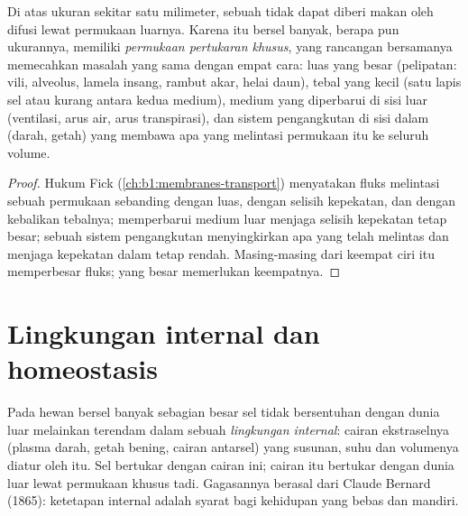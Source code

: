 \begin{proposition}\label{prop:b1:organism-environment:surfaces}
Di atas ukuran sekitar satu milimeter, sebuah  tidak dapat
diberi makan oleh difusi lewat permukaan luarnya. Karena itu 
bersel banyak, berapa pun ukurannya, memiliki \emph{permukaan pertukaran
khusus}, yang rancangan bersamanya
memecahkan masalah yang sama dengan empat cara: luas yang besar
(pelipatan: vili, alveolus, lamela insang, rambut akar, helai daun),
tebal yang kecil (satu lapis sel atau kurang antara kedua medium),
medium yang diperbarui di sisi luar (ventilasi, arus air, arus
transpirasi), dan sistem pengangkutan di sisi dalam (darah, getah) yang
membawa apa yang melintasi permukaan itu ke seluruh volume.
\end{proposition}
\begin{proof}
Hukum Fick (\cref{ch:b1:membranes-transport}) menyatakan fluks
melintasi sebuah permukaan sebanding dengan luas, dengan selisih
kepekatan, dan dengan kebalikan tebalnya; memperbarui medium luar
menjaga selisih kepekatan tetap besar; sebuah sistem pengangkutan
menyingkirkan apa yang telah melintas dan menjaga kepekatan dalam tetap
rendah. Masing-masing dari keempat ciri itu memperbesar fluks; 
yang besar memerlukan keempatnya.
\end{proof}

\section{Lingkungan internal dan homeostasis}

\begin{definition}\label{def:b1:organism-environment:milieu}
Pada hewan bersel banyak sebagian besar sel tidak bersentuhan dengan
dunia luar melainkan terendam dalam sebuah \emph{lingkungan
internal}: cairan ekstraselnya (plasma
darah, getah bening, cairan antarsel) yang susunan, suhu dan volumenya
diatur oleh  itu. Sel bertukar dengan cairan ini; cairan itu
bertukar dengan dunia luar lewat permukaan khusus tadi. Gagasannya
berasal dari Claude Bernard (1865): ketetapan  internal adalah
syarat bagi kehidupan yang bebas dan mandiri.
\end{definition}

